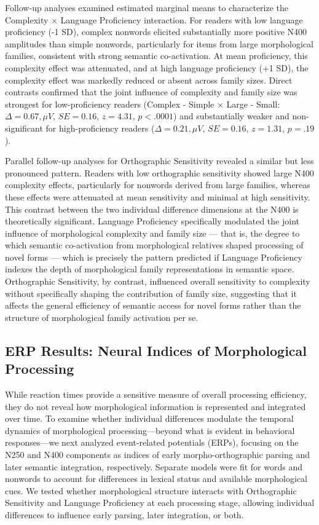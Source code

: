 \documentclass[utf8]{FrontiersinHarvard} %
\begin{document}
Follow-up analyses examined estimated marginal means to characterize the Complexity × Language Proficiency interaction. For readers with low language proficiency (-1 SD), complex nonwords elicited substantially more positive N400 amplitudes than simple nonwords, particularly for items from large morphological families, consistent with strong semantic co-activation. At mean proficiency, this complexity effect was attenuated, and at high language proficiency (+1 SD), the complexity effect was markedly reduced or absent across family sizes. Direct contrasts confirmed that the joint influence of complexity and family size was strongest for low-proficiency readers (Complex - Simple × Large - Small: $\Delta = 0.67,\mu V$, $SE = 0.16$, $z = 4.31$, $p < .0001$) and substantially weaker and non-significant for high-proficiency readers ($\Delta = 0.21,\mu V$, $SE = 0.16$, $z = 1.31$, $p = .19$).

Parallel follow-up analyses for Orthographic Sensitivity revealed a similar but less pronounced pattern. Readers with low orthographic sensitivity showed large N400 complexity effects, particularly for nonwords derived from large families, whereas these effects were attenuated at mean sensitivity and minimal at high sensitivity. This contrast between the two individual difference dimensions at the N400 is theoretically significant. Language Proficiency specifically modulated the joint influence of morphological complexity and family size — that is, the degree to which semantic co-activation from morphological relatives shaped processing of novel forms — which is precisely the pattern predicted if Language Proficiency indexes the depth of morphological family representations in semantic space. Orthographic Sensitivity, by contrast, influenced overall sensitivity to complexity without specifically shaping the contribution of family size, suggesting that it affects the general efficiency of semantic access for novel forms rather than the structure of morphological family activation per se.

\subsection{ERP Results: Neural Indices of Morphological Processing}
While reaction times provide a sensitive measure of overall processing efficiency, they do not reveal how morphological information is represented and integrated over time. To examine whether individual differences modulate the temporal dynamics of morphological processing—beyond what is evident in behavioral responses—we next analyzed event-related potentials (ERPs), focusing on the N250 and N400 components as indices of early morpho-orthographic parsing and later semantic integration, respectively. Separate models were fit for words and nonwords to account for differences in lexical status and available morphological cues. We tested whether morphological structure interacts with Orthographic Sensitivity and Language Proficiency at each processing stage, allowing individual differences to influence early parsing, later integration, or both.
\end{document}
